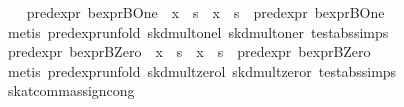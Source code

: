 \begin{isabellebody}
\isanewline
\ \ \isamarkupfalse%
\ {}pred{}expr\ bexpr{}BOne\ {}\ x\ {}{}\ s\ {}\ x\ {}{}\ s\ {}\ pred{}expr\ bexpr{}BOne{}\isanewline
\ \ \ \ \isamarkupfalse%
\ {}metis\ pred{}expr{}unfold\ skd{}mult{}onel\ skd{}mult{}oner\ test{}abs{}simps{}{}{}{}\isanewline
{}\isamarkupfalse%
\isanewline
\ \ \isamarkupfalse%
\ {}pred{}expr\ bexpr{}BZero\ {}\ x\ {}{}\ s\ {}\ x\ {}{}\ s\ {}\ pred{}expr\ bexpr{}BZero{}\isanewline
\ \ \ \ \isamarkupfalse%
\ {}metis\ pred{}expr{}unfold\ skd{}mult{}zerol\ skd{}mult{}zeror\ test{}abs{}simps{}{}{}{}\isanewline
{}\isamarkupfalse%
%
\endisatagproof
{\isafoldproof}%
%
\isadelimproof
\isanewline
%
\endisadelimproof
\isanewline
{}\isamarkupfalse%
\ skat{}comm{}assign{}cong{}\isanewline

\end{isabellebody}
